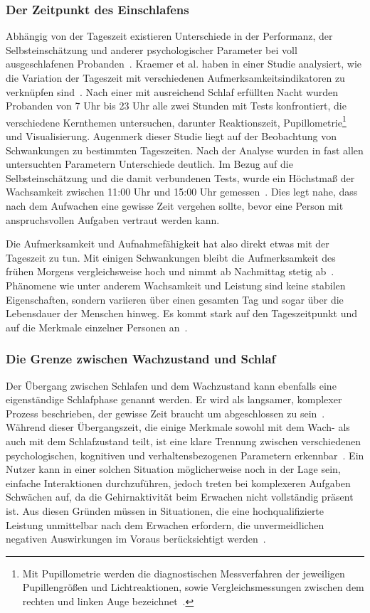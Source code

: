 \subsubsection{Der Zeitpunkt des Einschlafens}

Abhängig von der Tageszeit existieren Unterschiede in der Performanz, der Selbsteinschätzung und anderer psychologischer Parameter bei voll ausgeschlafenen Probanden~\cite{kraemer2000time}.
Kraemer et al. haben in einer Studie analysiert, wie die Variation der Tageszeit mit verschiedenen Aufmerksamkeitsindikatoren zu verknüpfen sind~\cite{kraemer2000time}. 
Nach einer mit ausreichend Schlaf erfüllten Nacht wurden Probanden von 7 Uhr bis 23 Uhr alle zwei Stunden mit Tests konfrontiert, die verschiedene Kernthemen untersuchen, darunter Reaktionszeit, Pupillometrie\footnote{Mit Pupillometrie werden die diagnostischen Messverfahren der jeweiligen Pupillengrößen und Lichtreaktionen, sowie Vergleichsmessungen zwischen dem rechten und linken Auge bezeichnet~\cite{sachsenweger1975neuroophthalmologie}.} und Visualisierung.
Augenmerk dieser Studie liegt auf der Beobachtung von Schwankungen zu bestimmten Tageszeiten. Nach der Analyse wurden in fast allen untersuchten Parametern Unterschiede deutlich. 
Im Bezug auf die Selbsteinschätzung und die damit verbundenen Tests, wurde ein Höchstmaß der Wachsamkeit zwischen 11:00 Uhr und 15:00 Uhr gemessen~\cite{kraemer2000time}. Dies legt nahe, dass nach dem Aufwachen eine gewisse Zeit vergehen sollte, bevor eine Person mit anspruchsvollen Aufgaben vertraut werden kann.

Die Aufmerksamkeit und Aufnahmefähigkeit hat also direkt etwas mit der Tageszeit zu tun.
Mit einigen Schwankungen bleibt die Aufmerksamkeit des frühen Morgens vergleichsweise hoch und nimmt ab Nachmittag stetig ab~\cite{kraemer2000time}.
Phänomene wie unter anderem Wachsamkeit und Leistung sind keine stabilen Eigenschaften, sondern variieren über einen gesamten Tag und sogar über die Lebensdauer der Menschen hinweg. 
Es kommt stark auf den Tageszeitpunkt und auf die Merkmale einzelner Personen an~\cite{kraemer2000time}.

\subsubsection{Die Grenze zwischen Wach­zu­stand und Schlaf}

Der Übergang zwischen Schlafen und dem Wachzustand kann ebenfalls eine eigenständige Schlafphase genannt werden. Er wird als langsamer, komplexer Prozess beschrieben, der gewisse Zeit braucht um abgeschlossen zu sein~\cite{ferrara2000sleep}. 
Während dieser Übergangszeit, die einige Merkmale sowohl mit dem Wach- als auch mit dem Schlafzustand teilt, ist eine klare Trennung zwischen verschiedenen psychologischen, kognitiven und verhaltensbezogenen Parametern erkennbar~\cite{ferrara2000sleep}. 
Ein Nutzer kann in einer solchen Situation möglicherweise noch in der Lage sein, einfache Interaktionen durchzuführen, jedoch treten bei komplexeren Aufgaben Schwächen auf, da die Gehirnaktivität beim Erwachen nicht vollständig präsent ist. 
Aus diesen Gründen müssen in Situationen, die eine hochqualifizierte Leistung unmittelbar nach dem Erwachen erfordern, die unvermeidlichen negativen Auswirkungen im Voraus berücksichtigt werden~\cite{ferrara2000sleep}.
